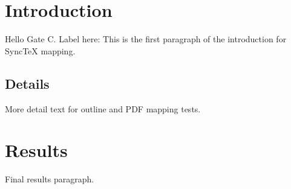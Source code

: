 \documentclass{article}
\begin{document}
\section{Introduction}
Hello Gate C. Label here: \label{sec:intro}
This is the first paragraph of the introduction for SyncTeX mapping.

\subsection{Details}
More detail text for outline and PDF mapping tests.

\section{Results}
Final results paragraph.
\end{document}
